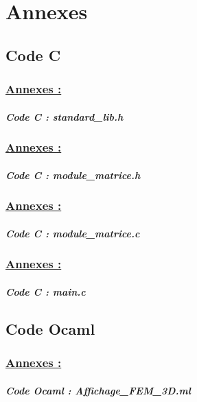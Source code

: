 \documentclass[10pt]{beamer}
\begin{document}
	\section{Annexes}
	\subsection{Code C}
	\begin{frame} [allowframebreaks]
		\frametitle{\uline{Annexes :}}
		\framesubtitle{\textit{Code C : standard\_lib.h}}
		
	\end{frame}
	\begin{frame}[allowframebreaks]
		\frametitle{\uline{Annexes :}}
		\framesubtitle{\textit{Code C : module\_matrice.h}}
		
	\end{frame}
	\begin{frame}[allowframebreaks]
		\frametitle{\uline{Annexes :}}
		\framesubtitle{\textit{Code C : module\_matrice.c}}
		
	\end{frame}
	\begin{frame}[allowframebreaks]
		\frametitle{\uline{Annexes :}}
		\framesubtitle{\textit{Code C : main.c}}
		
	\end{frame}
	\subsection{Code Ocaml}
	\begin{frame} [allowframebreaks]
		\frametitle{\uline{Annexes :}}
		\framesubtitle{\textit{Code Ocaml : Affichage\_FEM\_3D.ml}}
		
	\end{frame}
\end{document}
